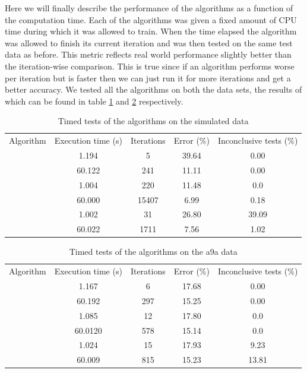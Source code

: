 Here we will finally describe the performance of the algorithms as a function of the computation time. Each of the algorithms was given a fixed amount of CPU time during which it was allowed to train. When the time elapsed the algorithm was allowed to finish its current iteration and was then tested on the same test data as before. This metric reflects real world performance slightly better than the iteration-wise comparison. This is true since if an algorithm performs worse per iteration but is faster then we can just run it for more iterations and get a better accuracy. We tested all the algorithms on both the data sets, the results of which can be found in table \ref{tbl:GDTime} and \ref{tbl:SVMTime} respectively.
\begin{table}[htbp]
\centering
\begin{tabular}{|c|c|c|c|c|}
\hline
Algorithm & Execution time (s) & Iterations & Error (\%) & Inconclusive tests (\%)  \\ \hhline{|=|=|=|=|=|}
\multirow{ 2}{*}{\adaB} & 1.194 & 5 & 39.64 & 0.00  \\\cline{2-5}
& 60.122 & 241 &  11.11 & 0.00  \\ \Xhline{1pt}
\multirow{ 2}{*}{\adaN} & 1.004 & 220 & 11.48  & 0.0 \\\cline{2-5}
& 60.000 & 15407 &  6.99 & 0.18  \\ \Xhline{1pt}
\multirow{ 2}{*}{\squintB} & 1.002 & 31 & 26.80  & 39.09\\\cline{2-5}
 & 60.022 & 1711 &  7.56  &  1.02\\ \hline
\end{tabular}
\caption{Timed tests of the algorithms on the simulated data}
\label{tbl:GDTime}
\end{table}

\begin{table}[htbp]
\centering
\begin{tabular}{|c|c|c|c|c|}
\hline
Algorithm & Execution time (s) & Iterations & Error (\%) & Inconclusive tests (\%)  \\ \hhline{|=|=|=|=|=|}
\multirow{ 2}{*}{\adaB} & 1.167 & 6 & 17.68 & 0.00  \\\cline{2-5}
& 60.192 & 297 &  15.25 & 0.00  \\ \Xhline{1pt}
\multirow{ 2}{*}{\NHB} & 1.085 & 12 & 17.80  & 0.0 \\\cline{2-5}
& 60.0120 & 578 &  15.14 & 0.0  \\ \Xhline{1pt}
\multirow{ 2}{*}{\squintB} & 1.024 & 15 & 17.93  & 9.23\\\cline{2-5}
 & 60.009 & 815 &  15.23  &  13.81\\ \hline
\end{tabular}
\caption{Timed tests of the algorithms on the a9a data}
\label{tbl:SVMTime}
\end{table}

